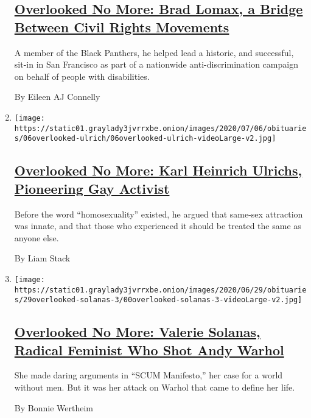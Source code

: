 \begin{enumerate}
  \hypertarget{overlooked-no-more-brad-lomax-a-bridge-between-civil-rights-movements}{%
  \subsection{\texorpdfstring{\href{/2020/07/08/obituaries/brad-lomax-overlooked.html}{Overlooked
  No More: Brad Lomax, a Bridge Between Civil Rights
  Movements}}{Overlooked No More: Brad Lomax, a Bridge Between Civil Rights Movements}}\label{overlooked-no-more-brad-lomax-a-bridge-between-civil-rights-movements}}

  A member of the Black Panthers, he helped lead a historic, and
  successful, sit-in in San Francisco as part of a nationwide
  anti-discrimination campaign on behalf of people with disabilities.

  By Eileen AJ Connelly
\item
  \texttt{[image: https://static01.graylady3jvrrxbe.onion/images/2020/07/06/obituaries/06overlooked-ulrich/06overlooked-ulrich-videoLarge-v2.jpg]}

  \hypertarget{overlooked-no-more-karl-heinrich-ulrichs-pioneering-gay-activist}{%
  \subsection{\texorpdfstring{\href{/2020/07/01/obituaries/karl-heinrich-ulrichs-overlooked.html}{Overlooked
  No More: Karl Heinrich Ulrichs, Pioneering Gay
  Activist}}{Overlooked No More: Karl Heinrich Ulrichs, Pioneering Gay Activist}}\label{overlooked-no-more-karl-heinrich-ulrichs-pioneering-gay-activist}}

  Before the word ``homosexuality'' existed, he argued that same-sex
  attraction was innate, and that those who experienced it should be
  treated the same as anyone else.

  By Liam Stack
\item
  \texttt{[image: https://static01.graylady3jvrrxbe.onion/images/2020/06/29/obituaries/29overlooked-solanas-3/00overlooked-solanas-3-videoLarge-v2.jpg]}

  \hypertarget{overlooked-no-more-valerie-solanas-radical-feminist-who-shot-andy-warhol}{%
  \subsection{\texorpdfstring{\href{/2020/06/26/obituaries/valerie-solanas-overlooked.html}{Overlooked
  No More: Valerie Solanas, Radical Feminist Who Shot Andy
  Warhol}}{Overlooked No More: Valerie Solanas, Radical Feminist Who Shot Andy Warhol}}\label{overlooked-no-more-valerie-solanas-radical-feminist-who-shot-andy-warhol}}

  She made daring arguments in ``SCUM Manifesto,'' her case for a world
  without men. But it was her attack on Warhol that came to define her
  life.

  By Bonnie Wertheim
\end{enumerate}

